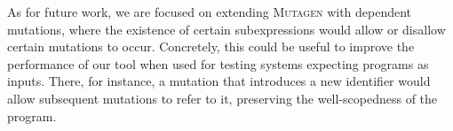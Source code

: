 \documentclass[10pt,conference]{IEEEtran}
\newcommand{\ourtool}{\textsc{Mutagen}\xspace}
\begin{document}
As for future work, we are focused on extending \ourtool with dependent mutations,
where the existence of certain subexpressions would allow or disallow certain
mutations to occur.
%
Concretely, this could be useful to improve the performance of our tool when
used for testing systems expecting programs as inputs.
%
There, for instance, a mutation that introduces a new identifier would allow
subsequent mutations to refer to it, preserving the well-scopedness of the
program.
%



{}

\end{document}
